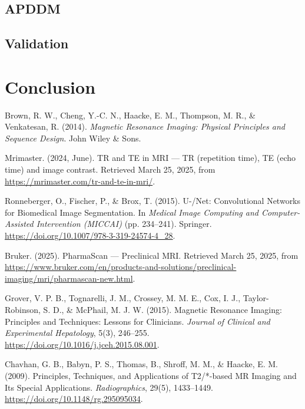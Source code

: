 \documentclass[twocolumn]{article}
\begin{document}
\subsection{APDDM}

\subsection{Validation}

\section{Conclusion}

\newpage
\onecolumn
\nocite{*}
\begin{thebibliography}{99}

     Brown, R. W., Cheng, Y.-C. N., Haacke, E. M., Thompson, M. R., \& Venkatesan, R. (2014). \textit{Magnetic Resonance Imaging: Physical Principles and Sequence Design}. John Wiley \& Sons.
    
     Mrimaster. (2024, June). TR and TE in MRI — TR (repetition time), TE (echo time) and image contrast. Retrieved March 25, 2025, from \url{https://mrimaster.com/tr-and-te-in-mri/}.
    
     Ronneberger, O., Fischer, P., \& Brox, T. (2015). U-/Net: Convolutional Networks for Biomedical Image Segmentation. In \textit{Medical Image Computing and Computer-Assisted Intervention (MICCAI)} (pp. 234–241). Springer. \url{https://doi.org/10.1007/978-3-319-24574-4_28}.
    
     Bruker. (2025). PharmaScan — Preclinical MRI. Retrieved March 25, 2025, from \url{https://www.bruker.com/en/products-and-solutions/preclinical-imaging/mri/pharmascan-new.html}.
    
     Grover, V. P. B., Tognarelli, J. M., Crossey, M. M. E., Cox, I. J., Taylor-Robinson, S. D., \& McPhail, M. J. W. (2015). Magnetic Resonance Imaging: Principles and Techniques: Lessons for Clinicians. \textit{Journal of Clinical and Experimental Hepatology}, 5(3), 246–255. \url{https://doi.org/10.1016/j.jceh.2015.08.001}.
    
     Chavhan, G. B., Babyn, P. S., Thomas, B., Shroff, M. M., \& Haacke, E. M. (2009). Principles, Techniques, and Applications of T2/*-based MR Imaging and Its Special Applications. \textit{Radiographics}, 29(5), 1433–1449. \url{https://doi.org/10.1148/rg.295095034}.
    

\end{thebibliography}
\end{document}
